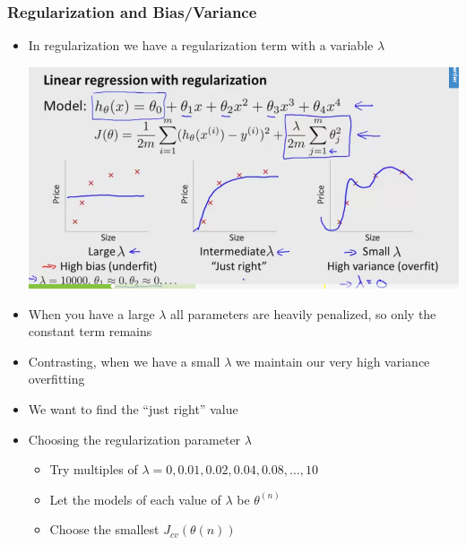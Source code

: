 \subsubsection{Regularization and Bias/Variance}
\begin{itemize}
	\item In regularization we have a regularization term with a variable $\lambda$
	\begin{center}
		\includegraphics[scale=0.5]{sections/cs229/w7/reg.png}
	\end{center}

	\item When you have a large $\lambda$ all parameters are heavily penalized, so only the constant term remains
	\item Contrasting, when we have a small $\lambda$ we maintain our very high variance overfitting
	\item We want to find the ``just right'' value
	\item Choosing the regularization parameter $\lambda$
	\begin{itemize}
		\item Try multiples of $\lambda=0,0.01,0.02,0.04,0.08,\ldots, 10$
		\item Let the models of each value of $\lambda$ be $\theta^{(n)}$
		\item Choose the smallest $J_{cv}(\theta{(n)})$
	\end{itemize}


\end{itemize}
